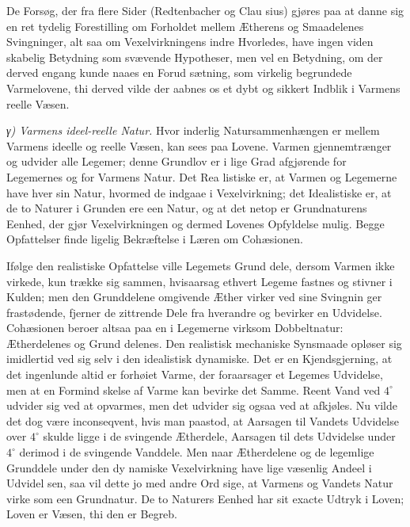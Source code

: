 \documentclass[12pt,a4paper]{book}
\newcommand{\subrunin}[1]{\emph{#1}\hspace{0.4em}}
\begin{document}
De Forsøg, der fra flere Sider (Redtenbacher og Clau\-%
sius) gjøres paa at danne sig en ret tydelig Forestilling om Forholdet
mellem Ætherens og Smaadelenes Svingninger, alt\-%
saa om Vexelvirkningens indre Hvorledes, have ingen viden\-%
skabelig Betydning som svævende Hypotheser, men vel en Betydning, om
der derved engang kunde naaes en Forud\-%
sætning, som virkelig begrundede Varmelovene, thi derved vilde der
aabnes os et dybt og sikkert Indblik i Varmens reelle Væsen.

\subrunin{γ) Varmens ideel-reelle Natur.} Hvor inderlig
Natursammenhængen er mellem Varmens ideelle og reelle Væsen, kan sees
paa Lovene. Varmen gjennemtrænger og udvider alle Legemer; denne
Grundlov er i lige Grad afgjørende for Legemernes og for Varmens Natur.
Det Rea\-%
listiske er, at Varmen og Legemerne have hver sin Natur, hvormed de
indgaae i Vexelvirkning; det Idealistiske er, at de to Naturer i
Grunden ere een Natur, og at det netop er Grundnaturens Eenhed, der
gjør Vexelvirkningen og dermed
Lovenes Opfyldelse mulig. Begge Opfattelser finde ligelig Bekræftelse i
Læren om Cohæsionen.

Ifølge den realistiske Opfattelse ville Legemets Grund\-%
dele, dersom Varmen ikke virkede, kun trække sig sammen, hvisaarsag
ethvert Legeme fastnes og stivner i Kulden; men den Grunddelene
omgivende Æther virker ved sine Svingnin\-%
ger frastødende, fjerner de zittrende Dele fra hverandre og bevirker en
Udvidelse. Cohæsionen beroer altsaa paa en i Legemerne virksom
Dobbeltnatur: Ætherdelenes og Grund\-%
delenes. Den realistisk mechaniske Synsmaade opløser sig imidlertid ved
sig selv i den idealistisk dynamiske. Det er en Kjendsgjerning, at det
ingenlunde altid er forhøiet Varme, der foraarsager et Legemes
Udvidelse, men at en Formind\-%
skelse af Varme kan bevirke det Samme. Reent Vand ved $4^{\circ}$
udvider sig ved at opvarmes, men det udvider sig ogsaa ved at afkjøles.
Nu vilde det dog være inconseqvent, hvis man paastod, at Aarsagen til
Vandets Udvidelse over $4^{\circ}$ skulde ligge i de svingende
Ætherdele, Aarsagen til dets Udvidelse under $4^{\circ}$ derimod i de
svingende Vanddele. Men naar Ætherdelene og de legemlige Grunddele
under den dy\-%
namiske Vexelvirkning have lige væsenlig Andeel i Udvidel\-%
sen, saa vil dette jo med andre Ord sige, at Varmens og Vandets Natur
virke som een Grundnatur. De to Naturers Eenhed har sit exacte Udtryk i
Loven; Loven er Væsen, thi den er Begreb.
\end{document}
